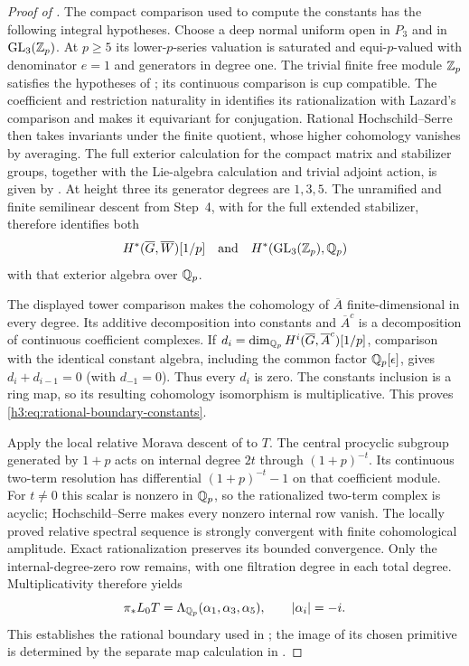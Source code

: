 \begin{proof}[Proof of ]
The compact comparison used to compute the constants
has the following integral hypotheses.  Choose a deep normal uniform
open in $P_3$ and in $\operatorname{GL}_3(\mathbb Z_p)$.  At $p\geq5$ its lower-$p$-series
valuation is saturated and equi-$p$-valued with denominator $e=1$
and generators in degree one.  The trivial finite free module $\mathbb Z_p$
satisfies the hypotheses of \cite[Theorem~3.3.3]{HuberKingsNaumann}; its continuous
comparison is cup compatible.  The coefficient and restriction
naturality in \cite[Theorem~3.1.1(1)--(3)]{HuberKingsNaumann}
identifies its rationalization with Lazard's comparison
\cite[V.2.4.9--V.2.4.10]{Lazard} and makes
it equivariant for conjugation.  Rational Hochschild--Serre then
takes invariants under the finite quotient, whose higher cohomology
vanishes by averaging.  The full exterior calculation for the compact
matrix and stabilizer groups, together with the Lie-algebra
calculation and trivial adjoint action, is given by
\cite[Proposition~3.8.1 and Lemma~3.8.2]{BSSW}.
At height three its generator degrees are $1,3,5$.
The unramified and finite semilinear descent from Step~4, with
\cite[Lemma~3.8.5(2)]{BSSW} for the full extended stabilizer, therefore identifies both
\[
 H^*(\overline G,\overline W)[1/p]
 \quad\text{and}\quad H^*(\operatorname{GL}_3(\mathbb Z_p),\mathbb Q_p)
\]
with that exterior algebra over $\mathbb Q_p$.

The displayed tower comparison makes the cohomology of
$\overline A$ finite-dimensional in every degree.  Its additive
decomposition into constants and $\overline A^c$ is a decomposition
of continuous coefficient complexes.  If
$d_i=\dim_{\mathbb Q_p}H^i(\overline G,\overline A^c)[1/p]$, comparison
with the identical constant algebra, including the common factor
$\mathbb Q_p[\epsilon]$, gives $d_i+d_{i-1}=0$ (with $d_{-1}=0$).
Thus every $d_i$ is zero.
The constants inclusion is a ring map, so its resulting
cohomology isomorphism is multiplicative.  This proves
\eqref{h3:eq:rational-boundary-constants}.

Apply the local relative Morava descent of
 to $T$.  The central procyclic subgroup
generated by $1+p$ acts on internal degree $2t$ through
$(1+p)^{-t}$.  Its continuous two-term resolution has differential
$(1+p)^{-t}-1$ on that coefficient module.  For $t\ne0$ this scalar
is nonzero in $\mathbb Q_p$, so the rationalized two-term complex is
acyclic; Hochschild--Serre makes every nonzero internal row vanish.
The locally proved relative spectral sequence is strongly convergent
with finite cohomological amplitude.  Exact rationalization preserves
its bounded convergence.  Only the internal-degree-zero row remains, with
one filtration degree in each total degree.  Multiplicativity
therefore yields
\[
 \pi_*L_0T=\Lambda_{\mathbb Q_p}(\alpha_1,\alpha_3,\alpha_5),
 \qquad |\alpha_i|=-i.
\]
This establishes the rational boundary used in
; the image of its chosen
primitive is determined by the separate map calculation in
.
\end{proof}
